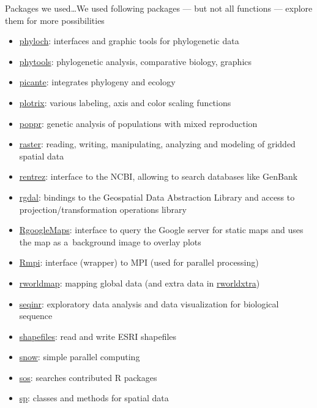 \documentclass[compress, ucs, xelatex, 11pt, xcolor=svgnames, aspectratio=169,
	hyperref={
		bookmarks=true,
		unicode=true,
		colorlinks=true,
		pdftitle={Molecular data in R},
		plainpages=false,
		pdfauthor={Vojtech Zeisek},
		pdfsubject={Course about phylogeny and evolution in R},
		pdfcreator={XeLaTeX},
		pdfkeywords={R, evolution, phylogeny, molecular data},
		linkcolor=Crimson, %
		anchorcolor=Magenta, %
		citecolor=Magenta, %
		filecolor=Magenta, %
		menucolor=Magenta, %
		urlcolor=DodgerBlue, %
		pdftex},
	url={hyphens, lowtilde} %
	]{beamer}
\begin{document}
\begin{frame}[allowframebreaks]{Packages we used\ldots}{We used following packages --- but not all functions --- explore them for more possibilities}
\begin{itemize}
		\item \href{http://www.christophheibl.de/Rpackages.html}{phyloch}: interfaces and graphic tools for phylogenetic data
		\item \href{https://CRAN.R-project.org/package=phytools}{phytools}: phylogenetic analysis, comparative biology, graphics
		\item \href{https://CRAN.R-project.org/package=picante}{picante}: integrates phylogeny and ecology
		\item \href{https://CRAN.R-project.org/package=plotrix}{plotrix}: various labeling, axis and color scaling functions
		\item \href{https://CRAN.R-project.org/package=poppr}{poppr}: genetic analysis of populations with mixed reproduction
		\item \href{https://CRAN.R-project.org/package=raster}{raster}: reading, writing, manipulating, analyzing and modeling of gridded spatial data
		\item \href{https://CRAN.R-project.org/package=rentrez}{rentrez}: interface to the NCBI, allowing to search databases like GenBank
		\item \href{https://CRAN.R-project.org/package=rgdal}{rgdal}: bindings to the Geospatial Data Abstraction Library and access to projection/transformation operations library
		\item \href{https://CRAN.R-project.org/package=RgoogleMaps}{RgoogleMaps}: interface to query the Google server for static maps and uses the map as a~background image to overlay plots
		\item \href{https://CRAN.R-project.org/package=Rmpi}{Rmpi}: interface (wrapper) to MPI (used for parallel processing)
		\item \href{https://CRAN.R-project.org/package=rworldmap}{rworldmap}: mapping global data (and extra data in \href{https://CRAN.R-project.org/package=rworldxtra}{rworldxtra})
		\item \href{https://CRAN.R-project.org/package=seqinr}{seqinr}: exploratory data analysis and data visualization for biological sequence
		\item \href{https://CRAN.R-project.org/package=shapefiles}{shapefiles}: read and write ESRI shapefiles
		\item \href{https://CRAN.R-project.org/package=snow}{snow}: simple parallel computing
		\item \href{https://CRAN.R-project.org/package=sos}{sos}: searches contributed R packages
		\item \href{https://CRAN.R-project.org/package=sp}{sp}: classes and methods for spatial data

\end{itemize}
\end{frame}
\end{document}
